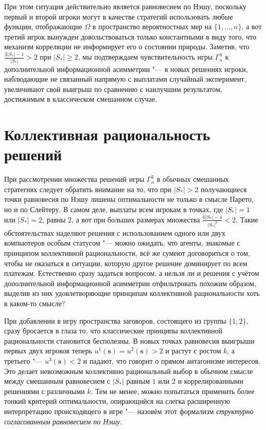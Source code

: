 При этом ситуация действительно является равновесием по Нэшу, поскольку первый и второй игроки могут в качестве стратегий использовать любые функции, отображающие $\Omega$ в пространство вероятностных мер на $\{1, \ldots, n\}$, а вот третий игрок вынужден довольствоваться только константными в виду того, что механизм корреляции не информирует его о состоянии природы. Заметив, что $\frac{3 \left| S_* \right| - 1}{\left| S_* \right|} > 2$ при $\left| S_* \right| \ge 2$, мы подтверждаем чувствительность игры $\Gamma^3_n$ к дополнительной информационной асимметрии "--- в новых решениях игроки, наблюдающие не связанный напрямую с выплатами случайный эксперимент, увеличивают свой выигрыш по сравнению с наилучшим результатом, достижимым в классическом смешанном случае.

\section{Коллективная рациональность решений}\label{sec:ch2/sec5}

При рассмотрении множества решений игры $\Gamma^3_n$ в обычных смешанных стратегиях следует обратить внимание на то, что при $\left| S_* \right| > 2$ получающиеся точки равновесия по Нэшу лишены оптимальности не только в смысле Парето, но и по Слейтеру. В самом деле, выплаты всем игрокам в точках, где $\left| S_* \right| = 1$ или $\left| S_* \right| = 2$, равны $2$, а вот при больших размерах множества $\frac{6 \left| S_* \right| - 4}{\left| S_* \right|^2} < 2$. Такие обстоятельствах наделяют решения с использованием одного или двух компьютеров особым статусом "--- можно ожидать, что агенты, знакомые с принципом коллективной рациональности, всё же сумеют договориться о том, чтобы не оказаться в ситуации, которую другое решение доминирует по всем платежам. Естественно сразу задаться вопросом, а нельзя ли и решения с учётом дополнительной информационной асимметрии отфильтровать похожим образом, выделив из них удовлетворяющие принципам коллективной рациональности хоть в каком-то смысле?

При добавлении в игру пространства заговоров, состоящего из группы $\{1, 2\}$, сразу бросается в глаза то, что классические принципы коллективной рациональности становится бесполезны. В новых точках равновесия выигрыши первых двух игроков теперь $u^1(\mathbf{s}) = u^2(\mathbf{s}) > 2$ и растут с ростом $k$, а третьего "--- $u^3(\mathbf{s}) < 2$ и падают, что говорит о прямом антагонизме интересов. Это делает невозможным коллективно рациональный выбор в обычном смысле между смешанным равновесием с $\left| S_* \right|$ равным $1$ или $2$ и коррелированными решениями с различными $k$. Тем не менее, можно попытаться применить более тонкий критерий оптимальности, опирающийся на слегка расширенную интерпретацию происходящего в игре "--- назовём этот формализм \emph{структурно согласованным равновесием по Нэшу}.

